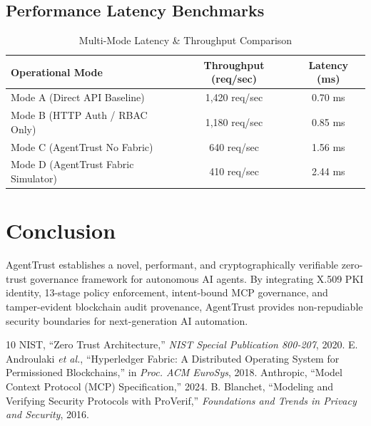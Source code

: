 \documentclass[10pt,journal,compsoc]{IEEEtran}
\begin{document}
\subsection{Performance Latency Benchmarks}
\begin{table}[h]
\caption{Multi-Mode Latency \& Throughput Comparison}
\centering
\begin{tabular}{@{}lcc@{}}
\toprule
\textbf{Operational Mode} & \textbf{Throughput (req/sec)} & \textbf{Latency (ms)} \\ \midrule
Mode A (Direct API Baseline) & 1,420 req/sec & 0.70 ms \\
Mode B (HTTP Auth / RBAC Only) & 1,180 req/sec & 0.85 ms \\
Mode C (AgentTrust No Fabric) & 640 req/sec & 1.56 ms \\
Mode D (AgentTrust Fabric Simulator) & 410 req/sec & 2.44 ms \\
\bottomrule
\end{tabular}
\end{table}

\section{Conclusion}
AgentTrust establishes a novel, performant, and cryptographically verifiable zero-trust governance framework for autonomous AI agents. By integrating X.509 PKI identity, 13-stage policy enforcement, intent-bound MCP governance, and tamper-evident blockchain audit provenance, AgentTrust provides non-repudiable security boundaries for next-generation AI automation.


\begin{thebibliography}{10}
NIST, ``Zero Trust Architecture,'' \emph{NIST Special Publication 800-207}, 2020.
E. Androulaki \emph{et al.}, ``Hyperledger Fabric: A Distributed Operating System for Permissioned Blockchains,'' in \emph{Proc. ACM EuroSys}, 2018.
Anthropic, ``Model Context Protocol (MCP) Specification,'' 2024.
B. Blanchet, ``Modeling and Verifying Security Protocols with ProVerif,'' \emph{Foundations and Trends in Privacy and Security}, 2016.
\end{thebibliography}
\end{document}
